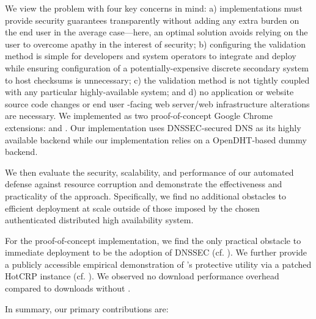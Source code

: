 We view the problem with four key concerns in mind: a) implementations must
provide security guarantees transparently without adding any extra burden on the
end user in the average case---here, an optimal solution avoids relying on the
user to overcome apathy in the interest of security; b) configuring the
validation method is simple for developers and system operators to integrate and
deploy while ensuring configuration of a potentially-expensive discrete
secondary system to host checksums is unnecessary; c) the validation method is
not tightly coupled with any particular highly-available system; and d) no
application or website source code changes or end user -facing web server/web
infrastructure alterations are necessary. We implemented \SYSTEM{} as two
proof-of-concept Google Chrome extensions: \DNSSYS{} and \DHTSYS{}. Our
\DNSSYS{} implementation uses DNSSEC-secured DNS as its highly available backend
while our \DHTSYS{} implementation relies on a OpenDHT-based dummy backend.

We then evaluate the security, scalability, and performance of our automated
defense against resource corruption and demonstrate the effectiveness and
practicality of the \SYSTEM{} approach. Specifically, we find no additional
obstacles to efficient deployment at scale outside of those imposed by the
chosen authenticated distributed high availability system.

For the proof-of-concept \DNSSYS{} implementation, we find the only practical
obstacle to immediate deployment to be the adoption of DNSSEC (cf.
). We further provide a publicly accessible empirical
demonstration of \DNSSYS{}'s protective utility via a patched HotCRP instance
(cf. ). We observed no download performance overhead
compared to downloads without \DNSSYS{}.

In summary, our primary contributions are:

